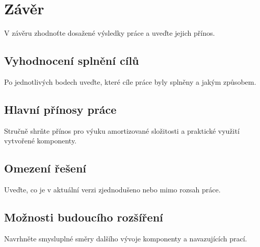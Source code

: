 \chapter{Závěr}

V závěru zhodnoťte dosažené výsledky práce a uveďte jejich přínos.

\section{Vyhodnocení splnění cílů}
Po jednotlivých bodech uveďte, které cíle práce byly splněny a jakým způsobem.

\section{Hlavní přínosy práce}
Stručně shrňte přínos pro výuku amortizované složitosti a praktické využití vytvořené komponenty.

\section{Omezení řešení}
Uveďte, co je v aktuální verzi zjednodušeno nebo mimo rozsah práce.

\section{Možnosti budoucího rozšíření}
Navrhněte smysluplné směry dalšího vývoje komponenty a navazujících prací.
